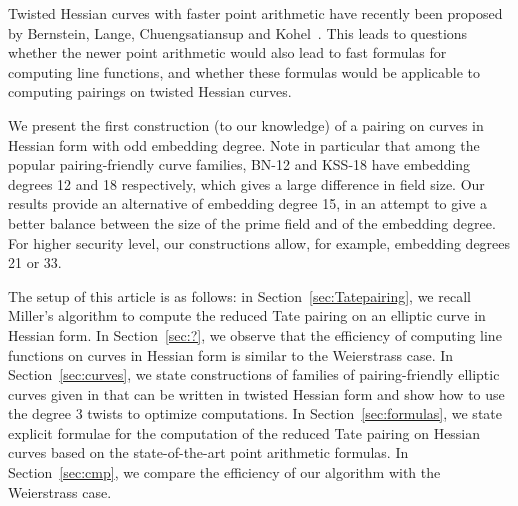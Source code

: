 Twisted Hessian curves with faster point arithmetic have recently been proposed by
Bernstein, Lange, Chuengsatiansup and Kohel~\cite{2015/hessian}.
This leads to questions whether the newer point arithmetic would also lead to fast formulas for computing line functions,
and whether these formulas would be applicable to computing pairings on twisted Hessian curves.

We present the first construction (to our knowledge) of a pairing on curves in Hessian form with odd embedding degree. Note in particular that among the popular pairing-friendly curve families,
BN-12 and KSS-18 have embedding degrees 12 and 18 respectively, which gives a large difference in field size. Our results provide an alternative of embedding degree 15, in an attempt to give a better balance between the size of the prime field and of the embedding degree. For higher security level, our constructions allow, for example, embedding degrees 21 or 33.

The setup of this article is as follows:
in Section~\ref{sec:Tatepairing}, we recall Miller's algorithm to compute the reduced Tate pairing on an elliptic curve in Hessian form.
In Section~\ref{sec:?}, we observe that the efficiency of computing line functions on curves in Hessian form is similar to the Weierstrass case. %
In Section~\ref{sec:curves}, we state constructions of families of pairing-friendly elliptic curves given in \cite{2010/freeman} that can be written in twisted Hessian form and show how to use the degree 3 twists to optimize computations.
In Section~\ref{sec:formulas}, we state explicit formulae for the computation of the reduced Tate pairing on Hessian curves based on the state-of-the-art point arithmetic formulas.
In Section~\ref{sec:cmp}, we compare the efficiency of our algorithm with the Weierstrass case.


